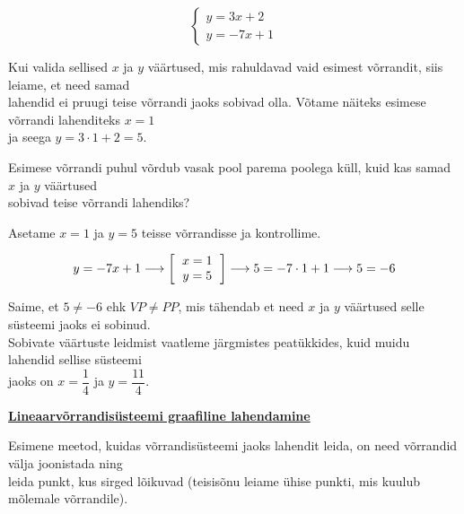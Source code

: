 \begin{center}
{{{\begin{flushleft}
\[ \begin{cases}
y=3x+2\\
y=-7x+1
\end{cases} \]

\hspace{5mm}
Kui valida sellised $x$ ja $y$ väärtused, mis rahuldavad vaid esimest võrrandit, siis leiame, et need samad\\ \hspace{5mm} lahendid ei pruugi teise võrrandi jaoks sobivad olla. Võtame näiteks esimese võrrandi lahenditeks $x=1$\\ \hspace{5mm} ja seega $y=3\cdot 1 +2=5$. 

\vspace{2mm}
\hspace{5mm}
Esimese võrrandi puhul võrdub vasak pool parema poolega küll, kuid kas samad $x$ ja $y$ väärtused\\ \hspace{5mm} sobivad teise võrrandi lahendiks?

\vspace{2mm}
\hspace{5mm}
Asetame $x=1$ ja $y=5$ teisse võrrandisse ja kontrollime.

\begin{equation}
\label{25_eq2}
y = -7x+1 \longrightarrow \left[ \begin{tabular}{c}
$x=1$\\
$y=5$
\end{tabular} \right] \longrightarrow 5=-7 \cdot 1 +1 \longrightarrow 5=-6
\end{equation}

\hspace{5mm}
Saime, et $5\neq -6$ ehk $VP \neq PP$, mis tähendab et need $x$ ja $y$ väärtused selle süsteemi jaoks ei sobinud.\\ \hspace{5mm} Sobivate väärtuste leidmist vaatleme järgmistes peatükkides, kuid muidu lahendid sellise süsteemi\\ \hspace{5mm} jaoks on $x=\dfrac{1}{4}$ ja $y=\dfrac{11}{4}$.

\vspace{5mm}
\hspace{5mm}
\textbf{\underline{Lineaarvõrrandisüsteemi graafiline lahendamine}}

\vspace{2mm}
\hspace{5mm}
Esimene meetod, kuidas võrrandisüsteemi jaoks lahendit leida, on need võrrandid välja joonistada ning\\ \hspace{5mm} leida punkt, kus sirged lõikuvad (teisisõnu leiame ühise punkti, mis kuulub mõlemale võrrandile).


\end{flushleft}}}}
\end{center}
